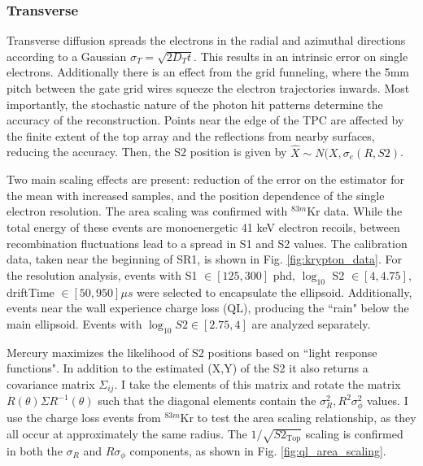 \subsubsection{Transverse}
Transverse diffusion spreads the electrons in the radial and azimuthal directions according to a Gaussian $\sigma_T = \sqrt{2 D_T t}$.
This results in an intrinsic error on single electrons.
Additionally there is an effect from the grid funneling, where the 5mm pitch between the gate grid wires squeeze the electron trajectories inwards.
Most importantly, the stochastic nature of the photon hit patterns determine the accuracy of the reconstruction.
Points near the edge of the TPC are affected by the finite extent of the top array and the reflections from nearby surfaces, reducing the accuracy.
Then, the S2 position is given by $\hat X \sim N(X, \sigma_e(R, S2)$.

Two main scaling effects are present: reduction of the error on the estimator for the mean with increased samples, and the position dependence of the single electron resolution.
The area scaling was confirmed with $^{83m}$Kr data.
While the total energy of these events are monoenergetic 41 keV electron recoils, between recombination fluctuations lead to a spread in S1 and S2 values. 
The calibration data, taken near the beginning of SR1, is shown in Fig. \ref{fig:krypton_data}.
For the resolution analysis, events with S1 $\in [125,300]$ phd, $\log_10$ S2 $\in [4, 4.75]$, driftTime $\in [50, 950] \mu s$ were selected to encapsulate the ellipsoid.
Additionally, events near the wall experience charge loss (QL), producing the ``rain" below the main ellipsoid.
Events with $\log_10 S2 \in [2.75, 4]$ are analyzed separately.

Mercury maximizes the likelihood of S2 positions based on ``light response functions"\cite{lux_collaboration_position_2018}.
In addition to the estimated (X,Y) of the S2 it also returns a covariance matrix $\Sigma_{ij}$.
I take the elements of this matrix and rotate the matrix $R(\theta) \Sigma R^{-1}(\theta)$ such that the diagonal elements contain the $\sigma^2_R, R^2\sigma^2_\phi$ values.
I use the charge loss events from $^{83m}$Kr to test the area scaling relationship, as they all occur at approximately the same radius.
The $1/\sqrt{S2_{\text{Top}}}$ scaling is confirmed in both the $\sigma_R$ and $R\sigma_\phi$ components, as shown in Fig. \ref{fig:ql_area_scaling}.

